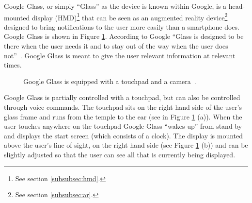 Google Glass, or simply ``Glass'' as the device is known within Google, is a head-mounted display (HMD)\footnote{See section \ref{subsubsec:hmd}.} that can be seen as an augmented reality device\footnote{See section \ref{subsubsec:ar}.} designed to bring notifications to the user more easily than a smartphone does. Google Glass is shown in Figure \ref{GoogleGlassHardware}. According to Google ``Glass is designed to be there when the user needs it and to stay out of the way when the user does not''~\cite{glassDesignPrinciples}. Google Glass is meant to give the user relevant information at relevant times.

	\begin{figure}[ht!]
		\centering
    \qquad
    \qquad
		\caption{Google Glass is equipped with a touchpad and a camera~\cite{ImagesGoogleGlassUI}.}
		\label{GoogleGlassHardware}
	\end{figure}

Google Glass is partially controlled with a touchpad, but can also be controlled through voice commands. The touchpad sits on the right hand side of the user's glass frame and runs from the temple to the ear (see in Figure \ref{GoogleGlassHardware} (a)). When the user touches anywhere on the touchpad Google Glass ``wakes up'' from stand by and displays the start screen (which consists of a clock). The display is mounted above the user's line of sight, on the right hand side (see Figure \ref{GoogleGlassHardware} (b)) and can be slightly adjusted so that the user can see all that is currently being displayed.


